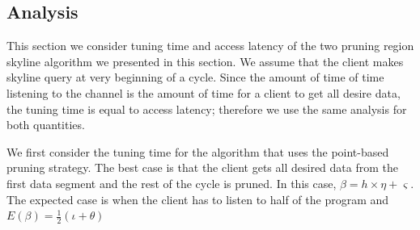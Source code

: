 

\subsection{Analysis}

This section we consider tuning time and access latency of the two
pruning region skyline algorithm we presented in this section. We
assume that the client makes skyline query at very beginning of a
cycle. Since the amount of time of time listening to the channel
is the amount of time for a client to get all desire data, the
tuning time is equal to access latency; therefore we use the same
analysis for both quantities.

We first consider the tuning time for the algorithm that uses the
point-based pruning strategy. The best case is that the client
gets all desired data from the first data segment and the rest of
the cycle is pruned. In this case, $\beta = h \times \eta +
\varsigma$. The expected case is when the client has to listen to
half of the program and $E(\beta) = \frac{1}{2}(\iota + \theta)$

